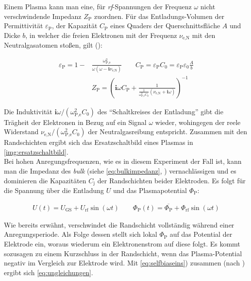 \documentclass[numbers=noenddot,a4paper,notitlepage,twoside,BCOR15mm]{scrbook}
\newcommand{\ix}[1]{_\text{#1}}
\newcommand{\imag}{\mathbf{i}}
\newcommand{\tilt}[1]{\textit{#1}}
\begin{document}
					Einem Plasma kann man eine, für \tilt{rf}-Spannungen der Frequenz $\omega$ nicht verschwindende Impedanz $Z\ix{P}$ zuordnen. Für das Entladungs-Volumen der Permittivität $\varepsilon\ix{P}$, der Kapazität $C\ix{P}$ eines Quaders der Querschnittsfläche $A$ und Dicke $b$, in welcher die freien Elektronen mit der Frequenz $\nu\ix{e,N}$ mit den Neutralgasatomen stoßen, gilt (\cite{Piel10}):

					\begin{align}
					\varepsilon\ix{P}=1-&\frac{\omega\ix{P,e}^2}{\omega\left(\omega-\imag\nu\ix{e,N}\right)} \quad \quad C\ix{P}=\varepsilon\ix{P}C\ix{0}=\varepsilon\ix{P}\varepsilon\ix{0}\frac{A}{b} \\
					&Z\ix{P}=\left(\imag\omega C\ix{P}+ \frac{1}{\frac{1}{\omega\ix{P,e}^2C\ix{0}}\left(\nu\ix{e,N}+\imag\omega\right)}\right)^{-1}
					\label{eq:bulkimpedanz}
					\end{align}

					Die Induktivität $\imag\omega/\left(\omega\ix{P,e}^2C\ix{0}\right)$ des "`Schaltkreises der Entladung"' gibt die Trägheit der Elektronen in Bezug auf ein Signal $\omega$ wieder, wohingegen der reele Widerstand $\nu\ix{e,N}/\left(\omega\ix{P,e}^2C\ix{0}\right)$ der Neutralgasreibung entspricht. Zusammen mit den Randschichten ergibt sich das Ersatzschaltbild eines Plasmas in \autoref{img:ersatzschaltbild}.\\
					Bei hohen Anregungsfrequenzen, wie es in diesem Experiment der Fall ist, kann man die Impedanz des \tilt{bulk} (siehe \autoref{eq:bulkimpedanz}, \cite{Kay85}) vernachlässigen und es dominieren die Kapazitäten $C\ix{j}$ der Randschichten beider Elektroden. Es folgt für die Spannung über die Entladung $U$ und das Plasmapotential $\Phi\ix{P}$:

						\begin{align}
							U\left(t\right)=U\ix{GS}+U\ix{rf}\sin\left(\omega t\right) \quad \quad \Phi\ix{P}\left(t\right)=\overline{\Phi\ix{P}}+\Phi\ix{rf}\sin\left(\omega t\right) \label{eq:selfbiaseins}
						\end{align}

					Wie bereits erwähnt, verschwindet die Randschicht vollständig während einer Anregungsperiode. Als Folge dessen stellt sich lokal $\Phi\ix{P}$ auf das Potential der Elektrode ein, woraus wiederum ein Elektronenstrom auf diese folgt. Es kommt sozusagen zu einem Kurzschluss in der Randschicht, wenn das Plasma-Potential negativ im Vergleich zur Elektrode wird. Mit \autoref{eq:selfbiaseins}) zusammen (nach \cite{Piel10}) ergibt sich \autoref{eq:ungleichungen}.
\end{document}
